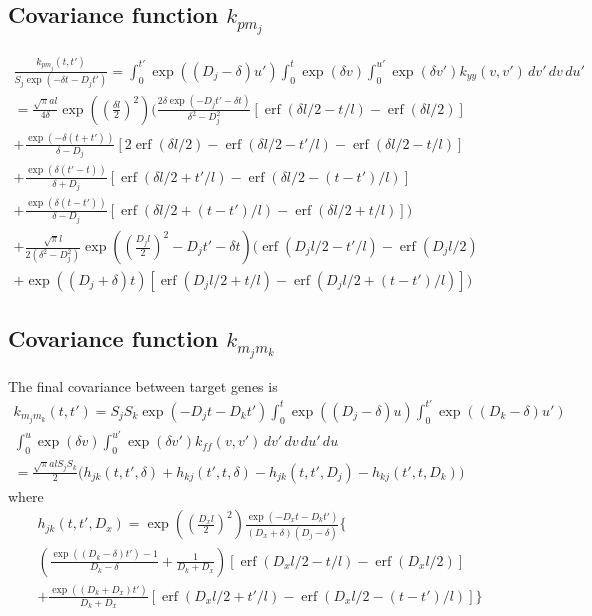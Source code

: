 \documentclass{article}
\newcommand{\erf}{\operatorname{erf}}
\begin{document}
\subsection{Covariance function $k_{pm_j}$}

\begin{multline}
  \frac{k_{p m_j}(t, t')}{S_j \exp(-\delta t - D_j t')} = 
  \int_0^{t'} \exp((D_j - \delta) u') \int_0^t \exp(\delta v) \int_0^{u'}
  \exp(\delta v') k_{yy}(v, v')\, dv'\, dv\, du' \\
  = 
  \frac{\sqrt{\pi}al}{4\delta}\exp\left(\left(\frac{\delta l}{2}\right)^2\right)
  \bigg(
  \frac{2 \delta \exp(- D_j t' - \delta t)}{\delta^2 - D_j^2}
  [\erf(\delta l / 2 - t/l) - \erf(\delta l / 2)]\\
  +
  \frac{\exp(- \delta (t + t'))}{\delta - D_j}
  [2\erf(\delta l / 2) - \erf(\delta l / 2 - t'/l) - \erf(\delta l / 2 - t/l)] \\
  +
  \frac{\exp(\delta (t' - t))}{\delta + D_j}
  [\erf(\delta l / 2 + t'/l) - \erf(\delta l / 2 - (t-t')/l)]\\
  +
  \frac{\exp(\delta (t - t'))}{\delta - D_j}
  [\erf(\delta l / 2 + (t-t')/l) - \erf(\delta l / 2 + t/l)]
  \bigg) \\
  + \frac{\sqrt{\pi}l}{2(\delta^2 - D_j^2)}
  \exp\left(\left(\frac{D_j l}{2}\right)^2 - D_j t' - \delta t \right)
  \bigg(
  \erf(D_j l/2 - t'/l) - \erf(D_j l/2) \\
  + \exp((D_j + \delta) t) [\erf(D_j l/2 + t/l) - \erf(D_j l/2 + (t-t')/l)]
  \bigg)
\end{multline}

\subsection{Covariance function $k_{m_j m_k}$}

The final covariance between target genes is
\begin{multline}
  k_{m_j m_k}(t, t') = S_j S_k \exp(-D_j t - D_k t')
  \int_0^t \exp((D_j - \delta) u)
  \int_0^{t'} \exp((D_k - \delta) u') \\
  \int_0^u \exp(\delta v) \int_0^{u'} \exp(\delta v') k_{ff}(v, v') \, dv'\, dv\, du'\, du \\
  = \frac{\sqrt{\pi} a l S_j S_k}{2} \bigg(
  h_{jk}(t, t', \delta) + h_{kj}(t', t, \delta) 
  - h_{jk}(t, t', D_j) - h_{kj}(t', t, D_k)
  \bigg)
\end{multline}
where
\begin{multline}
  h_{jk}(t, t', D_x) = 
  \exp\left(\left(\frac{D_x l}{2}\right)^2\right)
  \frac{\exp(-D_x t - D_k t')}{(D_x + \delta) (D_j - \delta)}
  \bigg\{ 
   \\
  \left(\frac{\exp((D_k-\delta) t') - 1}{D_k-\delta} +
    \frac{1}{D_k + D_x} \right)
  [\erf(D_x l/2 - t/l) - \erf(D_x l/2)]
  \\
  + \frac{\exp((D_k+D_x)t')}{D_k+D_x}
  [\erf(D_x l/2 + t'/l)
  - \erf(D_x l/2 - (t-t')/l)]
  \bigg\} \\
\end{multline}
\end{document}

